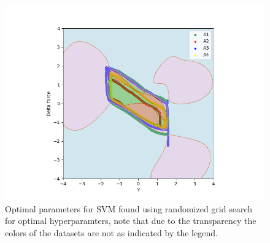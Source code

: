             \begin{figure}
                \centering
                \includegraphics[scale = 0.6]{figures/analysis/svm/SVM-gridOptimal.png}
                \caption{Optimal parameters for SVM found using randomized grid search for optimal hyperparamters, note that due to the transparency the colors of the datasets are not as indicated by the legend.}
                \label{fig:svm_optimal_param}
            \end{figure}
            
